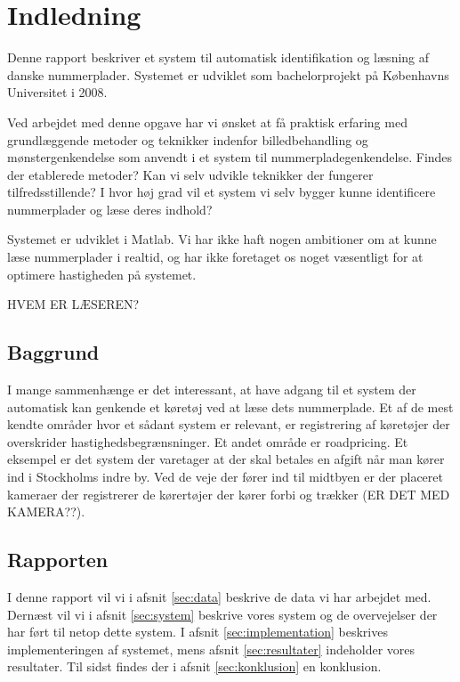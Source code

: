 \section{Indledning}

Denne rapport beskriver et system til automatisk identifikation og læsning af danske nummerplader. Systemet er udviklet som bachelorprojekt på Københavns Universitet i 2008.

Ved arbejdet med denne opgave har vi ønsket at få praktisk erfaring med grundlæggende metoder og teknikker indenfor billedbehandling og mønstergenkendelse som anvendt i et system til nummerpladegenkendelse. Findes der etablerede metoder? Kan vi selv udvikle teknikker der fungerer tilfredsstillende? I hvor høj grad vil et system vi selv bygger kunne identificere nummerplader og læse deres indhold?

Systemet er udviklet i Matlab. Vi har ikke haft nogen ambitioner om at kunne læse nummerplader i realtid, og har ikke foretaget os noget væsentligt for at optimere hastigheden på systemet.

HVEM ER LÆSEREN?

\subsection*{Baggrund}
I mange sammenhænge er det interessant, at have adgang til et system der automatisk kan genkende et køretøj ved at læse dets nummerplade. Et af de mest kendte områder hvor et sådant system er relevant, er registrering af køretøjer der overskrider hastighedsbegrænsninger. Et andet område er roadpricing. Et eksempel er det system der varetager at der skal betales en afgift når man kører ind i Stockholms indre by. Ved de veje der fører ind til midtbyen er der placeret kameraer der registrerer de kørertøjer der kører forbi og trækker (ER DET MED KAMERA??).


\subsection*{Rapporten}
I denne rapport vil vi i afsnit \vref{sec:data} beskrive de data vi har arbejdet med. Dernæst vil vi i afsnit \vref{sec:system} beskrive vores system og de overvejelser der har ført til netop dette system. I afsnit \vref{sec:implementation} beskrives implementeringen af systemet, mens afsnit \vref{sec:resultater} indeholder vores resultater. Til sidst findes der i afsnit \vref{sec:konklusion} en konklusion.


